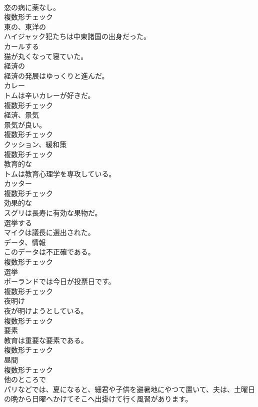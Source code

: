 \documentclass[8pt]{extreport}
\begin{document}
\begin{CJK}{UTF8}{min}
\\	恋の病に薬なし。	
\\	複数形チェック
\\	[形容詞]	東の、東洋の	
\\	ハイジャック犯たちは中東諸国の出身だった。	
\\	[動詞]	カールする	
\\	猫が丸くなって寝ていた。	
\\	[形容詞]	経済の	
\\	経済の発展はゆっくりと進んだ。	
\\	[名詞]	カレー	
\\	トムは辛いカレーが好きだ。	
\\	複数形チェック
\\	[名詞]	経済、景気	
\\	景気が良い。	
\\	複数形チェック
\\	[名詞]	クッション、緩和策	
\\	複数形チェック
\\	[形容詞]	教育的な	
\\	トムは教育心理学を専攻している。	
\\	[名詞]	カッター	
\\	複数形チェック
\\	[形容詞]	効果的な	
\\	スグリは長寿に有効な果物だ。	
\\	[動詞]	選挙する	
\\	マイクは議長に選出された。	
\\	[名詞]	データ、情報	
\\	このデータは不正確である。	
\\	複数形チェック
\\	[名詞]	選挙	
\\	ポーランドでは今日が投票日です。	
\\	複数形チェック
\\	[名詞]	夜明け	
\\	夜が明けようとしている。	
\\	複数形チェック
\\	[名詞]	要素	
\\	教育は重要な要素である。	
\\	複数形チェック
\\	[名詞]	昼間	
\\	複数形チェック
\\	[副詞]	他のところで	
\\	パリなどでは、夏になると、細君や子供を避暑地にやつて置いて、夫は、土曜日の晩から日曜へかけてそこへ出掛けて行く風習があります。	

\end{CJK}
\end{document}
